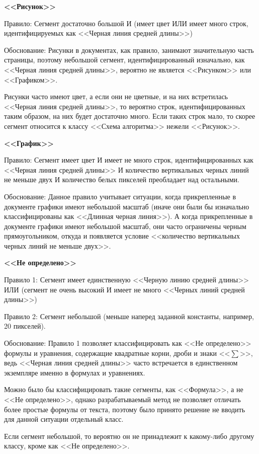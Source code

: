 \textbf{<<Рисунок>>}

Правило: Сегмент достаточно большой И (имеет цвет ИЛИ имеет много строк, идентифицируемых как <<Черная линия средней длины>>)

Обоснование: Рисунки в документах, как правило, занимают значительную часть страницы, поэтому небольшой сегмент, идентифицированный изначально, как <<Черная линия средней длины>>, вероятно не является <<Рисунком>> или <<Графиком>>.

Рисунки часто имеют цвет, а если они не цветные, и на них встретилась <<Черная линия средней длины>>, то вероятно строк, идентифицированных таким образом, на них будет достаточно много.
Если таких строк мало, то скорее сегмент относится к классу <<Схема алгоритма>> нежели <<Рисунок>>.

\textbf{<<График>>}

Правило: Сегмент имеет цвет И имеет не много строк, идентифицированных как <<Черная линия средней длины>> И количество вертикальных черных линий не меньше двух И количество белых пикселей преобладает над остальными.

Обоснование: Данное правило учитывает ситуации, когда прикрепленные в документе графики имеют небольшой масштаб (иначе они были бы изначально классифицированы как <<Длинная черная линия>>).
А когда прикрепленные в документе графики имеют небольшой масштаб, они часто ограничены черным прямоугольником, откуда и появляется условие <<количество вертикальных черных линий не меньше двух>>.

\textbf{<<Не определено>>}

Правило 1: Сегмент имеет единственную <<Черную линию средней длины>> ИЛИ (сегмент не очень высокий И имеет не много <<Черных линий средней длины>>)

Правило 2: Сегмент небольшой (меньше наперед заданной константы, например, 20 пикселей).

Обоснование: Правило 1 позволяет классифицировать как <<Не определено>> формулы и уравнения, содержащие квадратные корни, дроби и знаки <<$\sum$>>, ведь <<Черная линия средней длины>> часто встречается в единственном экземпляре именно в формулах и уравнениях.

Можно было бы классифицировать такие сегменты, как <<Формула>>, а не <<Не определено>>, однако разрабатываемый метод не позволяет отличать более простые формулы от текста, поэтому было принято решение не вводить для данной ситуации отдельный класс.

Если сегмент небольшой, то вероятно он не принадлежит к какому-либо другому классу, кроме как <<Не определено>>.

